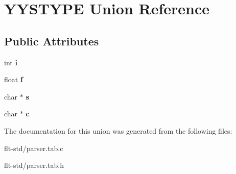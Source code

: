 \hypertarget{unionYYSTYPE}{}\section{Y\+Y\+S\+T\+Y\+P\+E Union Reference}
\label{unionYYSTYPE}
\subsection*{Public Attributes}
\begin{DoxyCompactItemize}
\item 
\hypertarget{unionYYSTYPE_ac818758881756c0236e9c66531f0981b}{}int {\bfseries i}\label{unionYYSTYPE_ac818758881756c0236e9c66531f0981b}

\item 
\hypertarget{unionYYSTYPE_a99776c8b7ad562bbdd4d866a3bb85041}{}float {\bfseries f}\label{unionYYSTYPE_a99776c8b7ad562bbdd4d866a3bb85041}

\item 
\hypertarget{unionYYSTYPE_a4c3840a759232ca58497542728f603e4}{}char $\ast$ {\bfseries s}\label{unionYYSTYPE_a4c3840a759232ca58497542728f603e4}

\item 
\hypertarget{unionYYSTYPE_a386770d676ebb4de29b20bcc79159c20}{}char $\ast$ {\bfseries c}\label{unionYYSTYPE_a386770d676ebb4de29b20bcc79159c20}

\end{DoxyCompactItemize}


The documentation for this union was generated from the following files\+:\begin{DoxyCompactItemize}
\item 
flt-\/std/parser.\+tab.\+c\item 
flt-\/std/parser.\+tab.\+h\end{DoxyCompactItemize}
